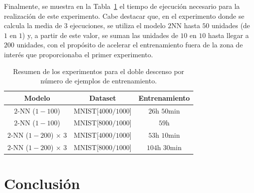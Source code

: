 Finalmente, se muestra en la Tabla~\ref{tab:model_training_time} el tiempo de ejecución necesario para la realización de este experimento. Cabe destacar que, en el experimento donde se calcula la media de $3$ ejecuciones, se utiliza el modelo $2$NN hasta $50$ unidades (de $1$ en $1$) y, a partir de este valor, se suman las unidades de $10$ en $10$ hasta llegar a $200$ unidades, con el propósito de acelerar el entrenamiento fuera de la zona de interés que proporcionaba el primer experimento.\newline

\begin{table}[h!]
\centering
\begin{tabular}{|c|c|c|}
\hline
\textbf{Modelo}       & \textbf{Dataset} & \textbf{Entrenamiento} \\ 
\hline
$2$-NN ($1-100$)      & MNIST[$4000/1000$]         & $26$h $50$min       \\ 
$2$-NN ($1-100$)      & MNIST[$8000/1000$]         & $59$h       \\ 
$2$-NN ($1-200$) $\times$ $3$     & MNIST[$4000/1000$]         & $53$h $10$min       \\ 
$2$-NN ($1-200$) $\times$ $3$      & MNIST[$8000/1000$]         & $104$h $30$min       \\ 
\hline
\end{tabular}
\caption[Resumen de los experimentos para el doble descenso por número de ejemplos de entrenamiento.]{Resumen de los experimentos para el doble descenso por número de ejemplos de entrenamiento.}
\label{tab:model_training_time}
\end{table}

\section{Conclusión}\label{sec:conclusion-informatica}

\endinput
